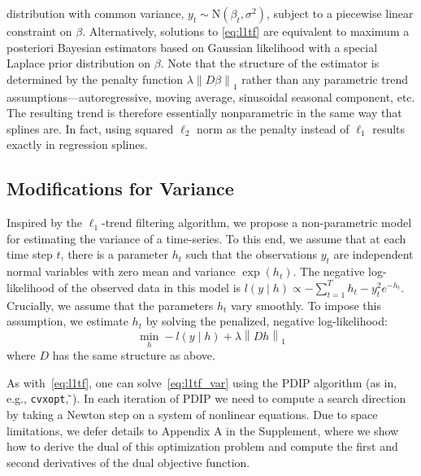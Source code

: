 \documentclass[letterpaper]{article} %
\newcommand{\citealp}[1]
{\citeauthor{#1} ̃\citeyear{#1}}
\newcommand{\autoref}{\Cref}
\newcommand{\given}{\;\vert\;}
\newcommand{\norm}[1]{\left\lVert #1 \right\rVert}
\begin{document}
distribution with common variance, $y_t \sim \mbox{N}(\beta_t,
\sigma^2)$, subject to a piecewise linear constraint on
$\beta$. Alternatively, solutions to \eqref{eq:l1tf} are equivalent to
maximum a posteriori Bayesian estimators based on Gaussian likelihood
with a special Laplace prior distribution on $\beta$. Note that the
structure of the estimator is determined by the penalty function
$\lambda\norm{D\beta}_1$ rather than any parametric trend
assumptions---autoregressive, moving average, sinusoidal seasonal
component, etc. The resulting trend is therefore essentially
nonparametric in the same way that splines are. In fact,
using squared $\ell_2$ norm as the penalty instead of $\ell_1$ results exactly in
regression splines.





\subsection{Modifications for Variance}
\label{sec:l1tf_var}


Inspired by the $\ell_1$-trend filtering algorithm, we propose a
non-parametric model for estimating the variance of a time-series. To
this end, we assume that at each time step $t$, there is a parameter
$h_t$ such that the observations $y_t$
are independent normal variables with zero mean and variance
$\exp(h_t)$. The negative log-likelihood of the observed data in this
model is $l(y\given h) \propto -\sum_{t=1}^T h_t - y_t^2e^{-h_t}$. Crucially,
we assume that the parameters $h_t$ vary smoothly. To impose
this assumption, we estimate $h_t$ by solving the penalized, negative
log-likelihood: 
\begin{equation}
\min_h -l(y\given h)+\lambda \norm{ Dh }_1
\label{eq:l1tf_var}
\end{equation}
where $D$ has the same structure as above.

As with~\eqref{eq:l1tf}, one can solve~\eqref{eq:l1tf_var} using the
PDIP algorithm (as in, e.g.,
\texttt{cvxopt}, \citealp{andersen_cvxopt:_2013}). In each iteration of
PDIP we need to compute a search direction by taking a Newton
step on a system of nonlinear equations. Due to space limitations, we
defer details to Appendix A in the Supplement, where we show how to
derive the dual of this optimization problem and compute the first and
second derivatives of the dual objective function.  
\end{document}
